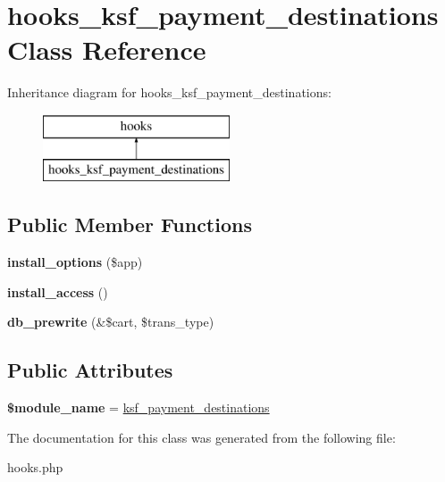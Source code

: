 \hypertarget{classhooks__ksf__payment__destinations}{}\section{hooks\+\_\+ksf\+\_\+payment\+\_\+destinations Class Reference}
\label{classhooks__ksf__payment__destinations}
Inheritance diagram for hooks\+\_\+ksf\+\_\+payment\+\_\+destinations\+:\begin{figure}[H]
\begin{center}
\leavevmode
\includegraphics[height=2.000000cm]{dc/db8/classhooks__ksf__payment__destinations}
\end{center}
\end{figure}
\subsection*{Public Member Functions}
\begin{DoxyCompactItemize}
\item 
\hypertarget{classhooks__ksf__payment__destinations_a6a07b236de0c9dc8ed26c89fa490fb22}{}\label{classhooks__ksf__payment__destinations_a6a07b236de0c9dc8ed26c89fa490fb22} 
{\bfseries install\+\_\+options} (\$app)
\item 
\hypertarget{classhooks__ksf__payment__destinations_a68fb815cf25f7c3ea22cef7e04ff3e97}{}\label{classhooks__ksf__payment__destinations_a68fb815cf25f7c3ea22cef7e04ff3e97} 
{\bfseries install\+\_\+access} ()
\item 
\hypertarget{classhooks__ksf__payment__destinations_ae23102a8b3dfe29e9c8c756b9cb6bed5}{}\label{classhooks__ksf__payment__destinations_ae23102a8b3dfe29e9c8c756b9cb6bed5} 
{\bfseries db\+\_\+prewrite} (\&\$cart, \$trans\+\_\+type)
\end{DoxyCompactItemize}
\subsection*{Public Attributes}
\begin{DoxyCompactItemize}
\item 
\hypertarget{classhooks__ksf__payment__destinations_a41d2b1da19c968a3fa217d08466e8e57}{}\label{classhooks__ksf__payment__destinations_a41d2b1da19c968a3fa217d08466e8e57} 
{\bfseries \$module\+\_\+name} = \textquotesingle{}\hyperlink{classksf__payment__destinations}{ksf\+\_\+payment\+\_\+destinations}\textquotesingle{}
\end{DoxyCompactItemize}


The documentation for this class was generated from the following file\+:\begin{DoxyCompactItemize}
\item 
hooks.\+php\end{DoxyCompactItemize}
